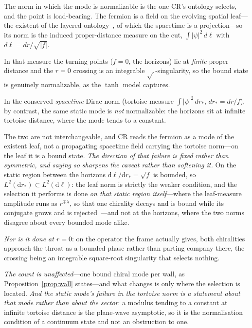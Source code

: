 \documentclass[11pt]{article}
\newcommand{\dd}{\mathrm{d}}
\begin{document}
The norm in which the mode is normalizable is the one CR's ontology selects, and the point is load-bearing. The fermion is a field on the evolving spatial leaf---the existent of the layered ontology~\cite{JanzenCRframework}, of which the spacetime is a projection---so its norm is the induced proper-distance measure on the cut, $\int|\psi|^2\,d\ell$ with $d\ell=dr/\sqrt{|f|}$. 

In that measure the turning points ($f=0$, the horizons) lie at \emph{finite} proper distance and the $r=0$ crossing is an integrable $\sqrt{\,}$-singularity, so the bound state is genuinely normalizable, as the $\tanh$ model captures. 

In the conserved \emph{spacetime} Dirac norm (tortoise measure $\int|\psi|^2\,dr_*$, $dr_*=dr/f$), by contrast, the same static mode is \emph{not} normalizable: the horizons sit at infinite tortoise distance, where the mode tends to a constant. 

The two are not interchangeable, and CR reads the fermion as a mode of the existent leaf, not a propagating spacetime field carrying the tortoise norm---on the leaf it is a bound state. \emph{The direction of that failure is fixed rather than symmetric, and saying so sharpens the caveat rather than softening it.} On the static region between the horizons $\dd\ell/\dd r_{*}=\sqrt f$ is bounded, so $L^{2}(\dd r_{*})\subset L^{2}(\dd\ell)$: the leaf norm is strictly the weaker condition, and the selection it performs is done \emph{on that static region itself}---where the leaf-measure amplitude runs as $r^{\mp\lambda}$, so that one chirality decays and is bound while its conjugate grows and is rejected~---and not at the horizons, where the two norms disagree about every bounded mode alike. 

\emph{Nor is it done at $r=0$}: on the operator the frame actually gives, both chiralities approach the throat as a bounded phase rather than parting company there, the crossing being an integrable square-root singularity that selects nothing. 

\emph{The count is unaffected}---one bound chiral mode per wall, as Proposition~\ref{prop:wall} states---and what changes is only where the selection is located. \emph{And the static mode's failure in the tortoise norm is a statement about that mode rather than about the sector}: a modulus tending to a constant at infinite tortoise distance is the plane-wave asymptotic, so it is the normalisation condition of a continuum state and not an obstruction to one. 
\end{document}
